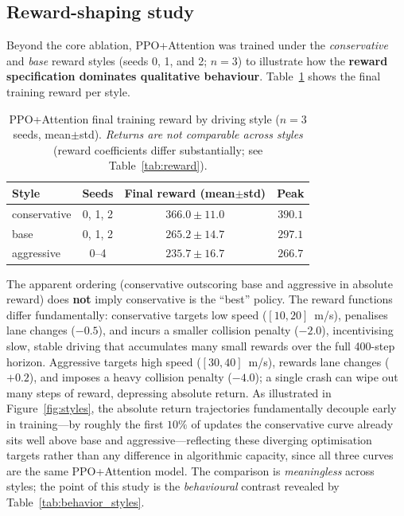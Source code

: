 \documentclass[conference]{IEEEtran}
\begin{document}
\subsection{Reward-shaping study}
\label{sec:styles}
Beyond the core ablation, PPO+Attention was trained under the \emph{conservative}
and \emph{base} reward styles (seeds 0, 1, and 2; $n=3$) to illustrate how the
\textbf{reward specification dominates qualitative behaviour}.
Table~\ref{tab:styles} shows the final training reward per style.

\begin{table}[t]
\caption{PPO+Attention final training reward by driving style ($n=3$ seeds, mean$\pm$std). \emph{Returns are not comparable across styles} (reward coefficients differ substantially; see Table~\ref{tab:reward}).}
\label{tab:styles}
\centering
\small
\begin{tabular}{@{}lccc@{}}
\toprule
Style & Seeds & Final reward (mean$\pm$std) & Peak \\
\midrule
conservative & 0, 1, 2 & $366.0 \pm 11.0$ & $390.1$ \\
base         & 0, 1, 2 & $265.2 \pm 14.7$ & $297.1$ \\
aggressive   & 0--4    & $235.7 \pm 16.7$ & $266.7$ \\
\bottomrule
\end{tabular}
\end{table}

The apparent ordering (conservative outscoring base and aggressive in absolute
reward) does \textbf{not} imply conservative is the ``best'' policy. The reward
functions differ fundamentally: conservative targets low speed ($[10,20]$~m/s),
penalises lane changes ($-0.5$), and incurs a smaller collision penalty ($-2.0$),
incentivising slow, stable driving that accumulates many small rewards over the
full 400-step horizon. Aggressive targets high speed ($[30,40]$~m/s), rewards
lane changes ($+0.2$), and imposes a heavy collision penalty ($-4.0$); a single
crash can wipe out many steps of reward, depressing absolute return. As
illustrated in Figure~\ref{fig:styles}, the absolute return trajectories
fundamentally decouple early in training---by roughly the first $10\%$ of
updates the conservative curve already sits well above base and aggressive---reflecting
these diverging optimisation targets rather than any difference in algorithmic
capacity, since all three curves are the same PPO+Attention model. The
comparison is \emph{meaningless} across styles; the point of this study is the
\emph{behavioural} contrast revealed by Table~\ref{tab:behavior_styles}.
\end{document}
